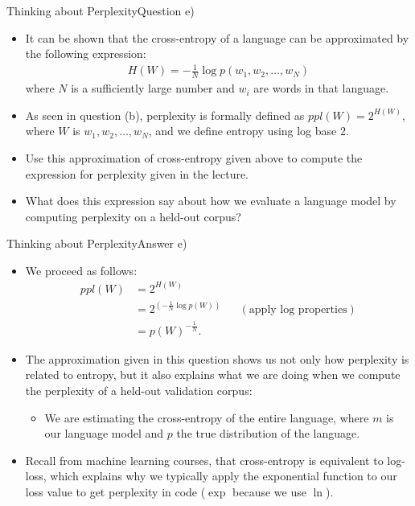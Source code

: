 \documentclass[t]{beamer}
\begin{document}
\begin{frame}{Thinking about Perplexity}{Question e)}
    \begin{itemize}
        \item It can be shown that the cross-entropy of a language can be
              approximated by the following expression:
              \begin{align}
                  H(W) = -\frac{1}{N} \log p(w_1,w_2,\ldots,w_N)
              \end{align}
              where $N$ is a sufficiently large number and $w_i$ are words in
              that language.
        \item As seen in question (b), perplexity is formally defined as
              $ppl(W) = 2^{H(W)}$, where $W$ is $w_1, w_2, \ldots, w_N$, and we
              define entropy using log base 2.
        \item Use this approximation of cross-entropy given above to compute the
              expression for perplexity given in the lecture.
        \item What does this expression say about how we evaluate a language
              model by computing perplexity on a held-out corpus?
    \end{itemize}
\end{frame}

\begin{frame}{Thinking about Perplexity}{Answer e)}
    \begin{itemize}
        \item We proceed as follows:
              \begin{align*}
                  ppl(W) & = 2^{H(W)}                                                                   \\
                         & = 2^{\left(-\frac{1}{N} \log p(W)\right)} &  & (\text{apply log properties}) \\
                         & = p(W)^{-\frac{1}{N}}.
              \end{align*}
        \item The approximation given in this question shows us not only how
              perplexity is related to entropy, but it also explains what we are
              doing when we compute the perplexity of a held-out validation
              corpus:
              \begin{itemize}
                  \item We are estimating the cross-entropy of the entire
                        language, where $m$ is our language model and $p$ the
                        true distribution of the language.
              \end{itemize}
        \item Recall from machine learning courses, that cross-entropy is
              equivalent to log-loss, which explains why we typically apply the
              exponential function to our loss value to get perplexity in code
              ($\exp$ because we use $\ln$).
    \end{itemize}
\end{frame}
\end{document}
